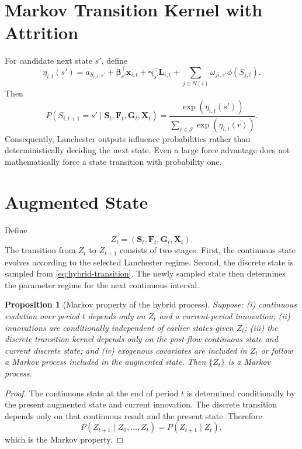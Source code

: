 \documentclass[11pt,letterpaper]{article}
\newtheorem{proposition}{Proposition}
\begin{document}
\section{Markov Transition Kernel with Attrition}
For candidate next state $s'$, define
\begin{equation}
\eta_{i,t}(s')
=
a_{S_{i,t},s'}
+\boldsymbol{\beta}_{s'}^{\top}\mathbf{x}_{i,t}
+\boldsymbol{\gamma}_{s'}^{\top}\mathbf{L}_{i,t}
+\sum_{j\in N(i)}\omega_{ji,s'}\phi(S_{j,t}).
\end{equation}
Then
\begin{equation}
P(S_{i,t+1}=s'\mid\mathbf{S}_t,\mathbf{F}_t,\mathbf{G}_t,\mathbf{X}_t)
=
\frac{\exp(\eta_{i,t}(s'))}{\sum_{r\in\mathcal{S}}\exp(\eta_{i,t}(r))}.
\label{eq:hybrid-transition}
\end{equation}
Consequently, Lanchester outputs influence probabilities rather than deterministically deciding the next state. Even a large force advantage does not mathematically force a state transition with probability one.

\section{Augmented State}
Define
\begin{equation}
Z_t=(\mathbf{S}_t,\mathbf{F}_t,\mathbf{G}_t,\mathbf{X}_t).
\label{eq:aug-state}
\end{equation}
The transition from $Z_t$ to $Z_{t+1}$ consists of two stages. First, the continuous state evolves according to the selected Lanchester regime. Second, the discrete state is sampled from \cref{eq:hybrid-transition}. The newly sampled state then determines the parameter regime for the next continuous interval.

\begin{proposition}[Markov property of the hybrid process]
Suppose: (i) continuous evolution over period $t$ depends only on $Z_t$ and a current-period innovation; (ii) innovations are conditionally independent of earlier states given $Z_t$; (iii) the discrete transition kernel depends only on the post-flow continuous state and current discrete state; and (iv) exogenous covariates are included in $Z_t$ or follow a Markov process included in the augmented state. Then $\{Z_t\}$ is a Markov process.
\end{proposition}
\begin{proof}
The continuous state at the end of period $t$ is determined conditionally by the present augmented state and current innovation. The discrete transition depends only on that continuous result and the present state. Therefore
\begin{equation}
P(Z_{t+1}\mid Z_0,\ldots,Z_t)=P(Z_{t+1}\mid Z_t),
\end{equation}
which is the Markov property.
\end{proof}
\end{document}

